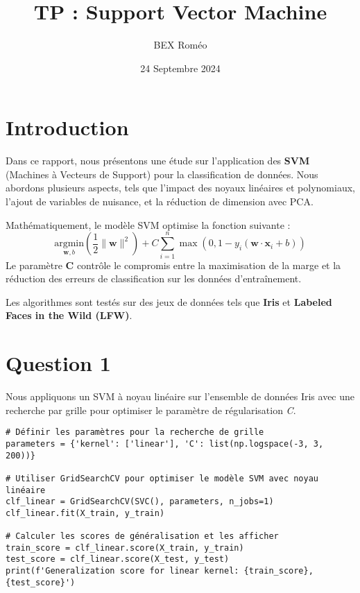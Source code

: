 \documentclass[a4paper,12pt]{article}
\title{TP : Support Vector Machine}
\author{BEX Roméo}
\date{24 Septembre 2024}
\begin{document}
\maketitle

\tableofcontents

\begin{figure}[H]
\centering

\end{figure}

\section*{Introduction}


Dans ce rapport, nous présentons une étude sur l'application des \textbf{SVM} (Machines à Vecteurs de Support) pour la classification de données. Nous abordons plusieurs aspects, tels que l'impact des noyaux linéaires et polynomiaux, l'ajout de variables de nuisance, et la réduction de dimension avec PCA.

Mathématiquement, le modèle SVM optimise la fonction suivante : 
\[
\underset{\mathbf{w},b}{\text{argmin}} \left( \frac{1}{2} \|\mathbf{w}\|^2 \right) + C \sum_{i=1}^{n} \max(0, 1 - y_i(\mathbf{w} \cdot \mathbf{x}_i + b))
\]
Le paramètre \textbf{C} contrôle le compromis entre la maximisation de la marge et la réduction des erreurs de classification sur les données d'entraînement.

Les algorithmes sont testés sur des jeux de données tels que \textbf{Iris} et \textbf{Labeled Faces in the Wild (LFW)}.

\section*{Question 1}

Nous appliquons un SVM à noyau linéaire sur l'ensemble de données Iris avec une recherche par grille pour optimiser le paramètre de régularisation \textit{C}.

\begin{verbatim}
# Définir les paramètres pour la recherche de grille
parameters = {'kernel': ['linear'], 'C': list(np.logspace(-3, 3, 200))}

# Utiliser GridSearchCV pour optimiser le modèle SVM avec noyau linéaire
clf_linear = GridSearchCV(SVC(), parameters, n_jobs=1)
clf_linear.fit(X_train, y_train)

# Calculer les scores de généralisation et les afficher
train_score = clf_linear.score(X_train, y_train)
test_score = clf_linear.score(X_test, y_test)
print(f'Generalization score for linear kernel: {train_score}, {test_score}')
\end{verbatim}
\end{document}
